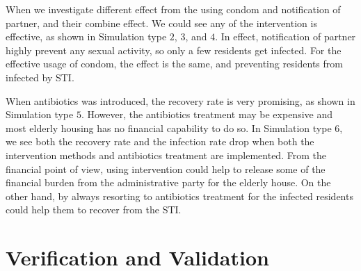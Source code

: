 \documentclass{article}
\begin{document}
\begin{normalsize}
When we investigate different effect from the using condom and notification of partner, and their combine effect. We could see any of the intervention is effective, as shown in Simulation type $2$, $3$, and $4$. In effect, notification of partner highly prevent any sexual activity, so only a few residents get infected. For the effective usage of condom, the effect is the same, and preventing residents from infected by STI.

When antibiotics was introduced, the recovery rate is very promising, as shown in Simulation type $5$. However, the antibiotics treatment may be expensive and most elderly housing has no financial capability to do so. In Simulation type $6$, we see both the recovery rate and the infection rate drop when both the intervention methods and antibiotics treatment are implemented. From the financial point of view, using intervention could help to release some of the financial burden from the administrative party for the elderly house. On the other hand, by always resorting to antibiotics treatment for the infected residents could help them to recover from the STI.

\section{Verification and Validation}

\end{normalsize}
\end{document}

